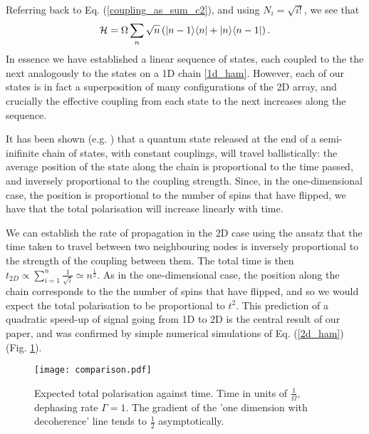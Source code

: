                 Referring back to Eq. (\ref{coupling_as_sum_c2}), and using $N_i=\sqrt{i!}$, we see that
                \begin{equation}
{\cal{H}} = \Omega \sum_{n} \sqrt{n} \left( \vert n-1\rangle \langle n\vert +
    \vert n\rangle \langle n-1\vert \right) .
\label{2d_ham}
\end{equation}
In essence we have established a linear sequence of states, each coupled to the the next analogously to the states on a 1D chain \ref{1d_ham}. However, each of our states is in fact a superposition of many configurations of the 2D array, and crucially the effective coupling from each state to the next increases along the sequence.



It has been shown (e.g. \cite{Fitzsimons:2005p6472}) that a quantum state released at the end of a semi-inifinite chain of states, with constant couplings, will travel ballistically: the average position of the state along the chain is proportional to the time passed, and inversely proportional to the coupling strength. Since, in the one-dimensional case, the position is proportional to the number of spins that have flipped, we have that the total polarisation will increase linearly with time.

We can establish the rate of propagation in the 2D case using the ansatz that the time taken to travel between two neighbouring nodes is inversely proportional to the strength of the coupling between them. The total time is then $t_{2D}\propto \sum_{i=1}^{n}\frac{1}{\sqrt{i}}\simeq n^{\frac{1}{2}}$. As in the one-dimensional case, the position along the chain corresponds to the the number of spins that have flipped, and so we would expect the total polarisation to be proportional to $t^2$. This prediction of a quadratic speed-up of signal going from 1D to 2D is the central result of our paper, and was confirmed by simple numerical simulations of Eq. (\ref{2d_ham}) (Fig. \ref{comparison}).

\begin{figure}
\texttt{[image: comparison.pdf]}
\caption{Expected total polarisation against time. Time in units of
  $\frac{1}{\Omega}$, dephasing rate $\Gamma = 1$. The gradient of the
    'one dimension with decoherence' line tends to $\frac{1}{2}$ asymptotically.}
    \label{comparison}
    \end{figure}



